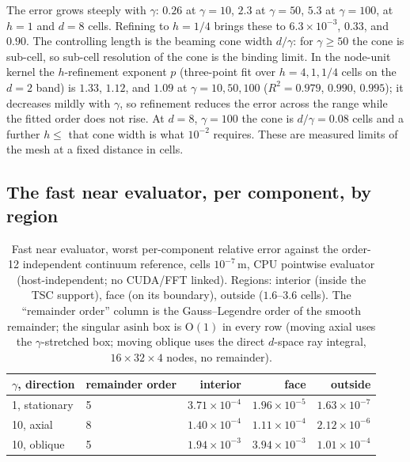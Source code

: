 The error grows steeply with $\gamma$: $0.26$ at $\gamma=10$,
$2.3$ at $\gamma=50$, $5.3$ at $\gamma=100$, at $h=1$ and $d=8$ cells.
Refining to $h=1/4$ brings these to $6.3\times10^{-3}$,
$0.33$, and $0.90$. The controlling length is the beaming cone
width $d/\gamma$: for $\gamma\ge50$ the cone is sub-cell, so sub-cell
resolution of the cone is the binding limit. In the node-unit kernel the
$h$-refinement exponent $p$ (three-point fit over $h=4,1,1/4$ cells on the
$d=2$ band) is $1.33$, $1.12$, and $1.09$ at $\gamma=10,50,100$
($R^2=0.979$, $0.990$, $0.995$); it decreases mildly with $\gamma$, so
refinement reduces the error across the range while the fitted order does
not rise. At $d=8$, $\gamma=100$ the cone is
$d/\gamma=0.08$ cells and a further $h\le$ that cone width is what
$10^{-2}$ requires. These are measured limits of the mesh at a fixed
distance in cells.

\subsection{The fast near evaluator, per component, by region}
\label{sec:fastacc}

\begin{table}[t]
\centering
\small
\caption{Fast near evaluator, worst per-component relative error against
the order-12 independent continuum reference, cells $10^{-7}$\,m,
CPU pointwise evaluator (host-independent; no CUDA/FFT linked). Regions: interior (inside the TSC
support), face (on its boundary), outside ($1.6$--$3.6$ cells). The
``remainder order'' column is the Gauss--Legendre order of the smooth
remainder; the singular $\mathrm{asinh}$ box is $\mathrm{O}(1)$ in every
row (moving axial uses the $\gamma$-stretched box; moving oblique uses the
direct $d$-space ray integral, $16\times32\times4$ nodes, no remainder).}
\label{tab:fast}
\begin{tabular}{llrrr}
\toprule
$\gamma$, direction & remainder order & interior & face & outside \\
\midrule
 1, stationary   & 5 & $3.71\times10^{-4}$ & $1.96\times10^{-5}$ & $1.63\times10^{-7}$ \\
 10, axial       & 8 & $1.40\times10^{-4}$ & $1.11\times10^{-4}$ & $2.12\times10^{-6}$ \\
 10, oblique     & 5 & $1.94\times10^{-3}$ & $3.94\times10^{-3}$ & $1.01\times10^{-4}$ \\
\bottomrule
\end{tabular}
\end{table}

